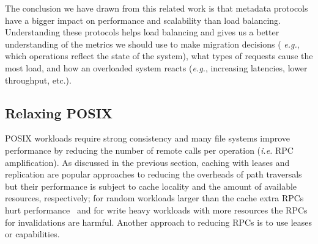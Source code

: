 
The conclusion we have drawn from this related work is that metadata protocols
have a bigger impact on performance and scalability than load balancing.  
Understanding these protocols helps load balancing and gives us a better
understanding of the metrics we should use to make migration decisions ({\it
e.g.}, which operations reflect the state of the system), what types of
requests cause the most load, and how an overloaded system reacts ({\it e.g.},
increasing latencies, lower throughput, etc.).

\subsection{Relaxing POSIX}

POSIX workloads require strong consistency and many file systems improve
performance by reducing the number of remote calls per operation ({\it i.e.}
RPC amplification). As discussed in the previous section, caching with leases and
replication are popular approaches to reducing the overheads of path traversals
but their performance is subject to cache locality and the amount of available
resources, respectively; for random workloads larger than the cache extra RPCs
hurt performance~\cite{ren:sc2014-indexfs, weil:sc2004-dyn-metadata} and for write heavy workloads with more
resources the RPCs for invalidations are harmful. Another approach to reducing
RPCs is to use leases or capabilities.  



